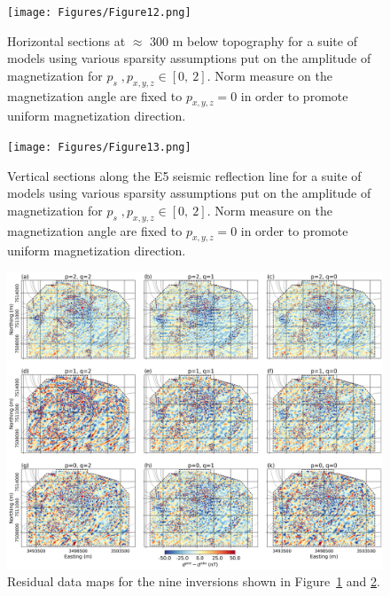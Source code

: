 \documentclass[paper]{geophysics}
\begin{document}
\begin{figure}[p!]
\texttt{[image: Figures/Figure12.png]}
\caption{Horizontal sections at $\approx$ 300 m below topography for a suite of models using various sparsity assumptions put on the amplitude of magnetization for $p_s\;, p_{x,y,z} \in [0,\: 2]$. Norm measure on the magnetization angle are fixed to $p_{x,y,z}=0$ in order to promote uniform magnetization direction.}
\label{MVIS_Hsections}
\end{figure}

\begin{figure}[p!]
\texttt{[image: Figures/Figure13.png]}
\caption{Vertical sections along the E5 seismic reflection line for a suite of models using various sparsity assumptions put on the amplitude of magnetization for $p_s\;, p_{x,y,z} \in [0,\: 2]$. Norm measure on the magnetization angle are fixed to $p_{x,y,z}=0$ in order to promote uniform magnetization direction.}
\label{MVIS_Vsections}
\end{figure}

\begin{figure}[p!]
\includegraphics[width=\columnwidth]{Figures/Figure14.png}
\caption{Residual data maps for the nine inversions shown in Figure~\ref{MVIS_Hsections} and \ref{MVIS_Vsections}.}
\label{MVIS_predicted}
\end{figure}
\end{document}
